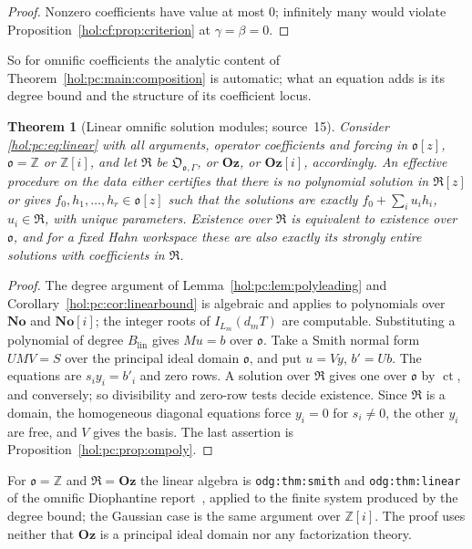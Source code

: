 \documentclass[11pt]{article}
\numberwithin{equation}{section}
\newtheorem{theorem}{Theorem}[section]
\theoremstyle{definition}
\theoremstyle{remark}
\newcommand{\Z}{\mathbb Z}
\newcommand{\No}{\mathbf{No}}
\newcommand{\Oz}{\mathbf{Oz}}
\begin{document}
\begin{proof}
Nonzero coefficients have value at most $0$; infinitely many would violate
Proposition~\ref{hol:cf:prop:criterion} at $\gamma=\beta=0$.
\end{proof}

So for omnific coefficients the analytic content of
Theorem~\ref{hol:pc:main:composition} is automatic; what an equation adds is
its degree bound and the structure of its coefficient locus.

\begin{theorem}[Linear omnific solution modules; source~15]
\label{hol:pc:thm:linarith}
Consider \eqref{hol:pc:eq:linear} with all arguments, operator coefficients and
forcing in $\mathfrak o[z]$, $\mathfrak o=\Z$ or $\Z[i]$, and let $\mathfrak R$
be $\mathfrak O_{\mathfrak o,\Gamma}$, or $\Oz$, or $\Oz[i]$, accordingly. An
effective procedure on the data either certifies that there is no polynomial
solution in $\mathfrak R[z]$ or gives $f_0,h_1,\ldots,h_r\in\mathfrak o[z]$
such that the solutions are exactly $f_0+\sum_iu_ih_i$, $u_i\in\mathfrak R$,
with unique parameters. Existence over $\mathfrak R$ is equivalent to
existence over $\mathfrak o$, and for a fixed Hahn workspace these are also
exactly its strongly entire solutions with coefficients in $\mathfrak R$.
\end{theorem}

\begin{proof}
The degree argument of Lemma~\ref{hol:pc:lem:polyleading} and
Corollary~\ref{hol:pc:cor:linearbound} is algebraic and applies to polynomials
over $\No$ and $\No[i]$; the integer roots of $I_{L_m}(d_mT)$ are computable.
Substituting a polynomial of degree $B_{\mathrm{lin}}$ gives $Mu=b$ over
$\mathfrak o$. Take a Smith normal form $UMV=S$ over the principal ideal domain
$\mathfrak o$, and put $u=Vy$, $b'=Ub$. The equations are $s_iy_i=b'_i$ and
zero rows. A solution over $\mathfrak R$ gives one over $\mathfrak o$ by $\operatorname{ct}$,
and conversely; so divisibility and zero-row tests decide existence. Since
$\mathfrak R$ is a domain, the homogeneous diagonal equations force $y_i=0$ for
$s_i\ne0$, the other $y_i$ are free, and $V$ gives the basis. The last
assertion is Proposition~\ref{hol:pc:prop:ompoly}.
\end{proof}

For $\mathfrak o=\Z$ and $\mathfrak R=\Oz$ the linear algebra is
\texttt{odg:thm:smith} and \texttt{odg:thm:linear} of the omnific Diophantine
report~\cite{repoodg}, applied to the finite system produced by the degree
bound; the Gaussian case is the same argument over $\Z[i]$. The proof uses
neither that $\Oz$ is a principal ideal domain nor any factorization theory.
\end{document}
